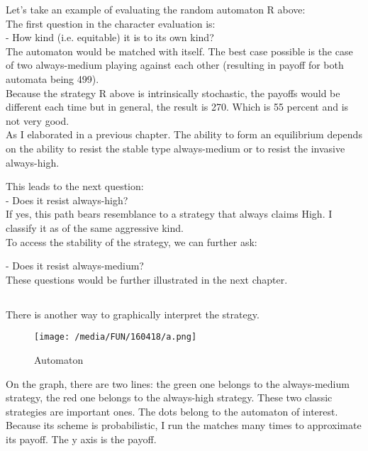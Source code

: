\documentclass[12.5pt]{report}
\begin{document}
Let's take an example of evaluating the random automaton R above: \\
The first question in the character evaluation is: \\

- How kind (i.e. equitable) it is to its own kind?\\

The automaton would be matched with itself. The best case possible is the case of two always-medium playing against each other (resulting in payoff for both automata being 499).\\

Because the strategy R above is intrinsically stochastic, the payoffs would be different each time but in general, the result is 270. Which is 55 percent and is not very good.\\

As I elaborated in a previous chapter. The ability to form an equilibrium depends on the ability to resist the stable type always-medium or to resist the invasive always-high.

This leads to the next question:\\

- Does it resist always-high?\\

If yes, this path bears resemblance to a strategy that always claims High. I classify it as of the same aggressive kind.\\

To access the stability of the strategy, we can further ask:

- Does it resist always-medium?\\

These questions would be further illustrated in the next chapter.

\subsection{}

There is another way to graphically interpret the strategy.

\begin{figure}[h!]
\center
\texttt{[image: /media/FUN/160418/a.png]}
\caption{Automaton}
\end{figure}

On the graph, there are two lines: the green one belongs to the always-medium strategy, the red one belongs to the always-high strategy. These two classic strategies are important ones. The dots belong to the automaton of interest. Because its scheme is probabilistic, I run the matches many times to approximate its payoff. The y axis is the payoff.\\
\end{document}
